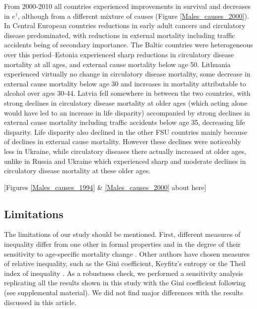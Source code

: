 \documentclass{article}
\begin{document}
\begin{spacing}{1.5}
From 2000-2010 all countries experienced improvements in survival and decreases in $e^\dagger$, although from a different mixture of causes (Figure \ref{Males_causes_2000}). In Central European countries reductions in early adult cancers and circulatory disease predominated, with reductions in external mortality including traffic accidents being of secondary importance. The Baltic countries were heterogeneous over this period--Estonia experienced sharp reductions in circulatory disease mortality at all ages, and external cause mortality below age 50. Lithuania experienced virtually no change in circulatory disease mortality, some decrease in external cause mortality below age 30 and increases in mortality attributable to alcohol over ages 30-44. Latvia fell somewhere in between the two countries, with strong declines in circulatory disease mortality at older ages (which acting alone would have led to an increase in life disparity) accompanied by strong declines in external cause mortality including traffic accidents below age 35, decreasing life disparity. Life disparity also declined in the other FSU countries mainly because of declines in external cause mortality. However these declines were noticeably less in Ukraine, while circulatory diseases there actually increased at older ages, unlike in Russia and Ukraine which experienced sharp and moderate declines in circulatory disease mortality at these older ages.\\



\begin{center}
[Figures \ref{Males_causes_1994} \& \ref{Males_causes_2000} about here]\\
\end{center}


\subsection*{Limitations} 
The limitations of our study should be mentioned. First, different measures of inequality differ from one other in formal properties and in the degree of their sensitivity to age-specific mortality change \citep{vanraalte2013}. Other authors have chosen measures of relative inequality, such as the Gini coefficient, Keyfitz's entropy or the Theil index of inequality \citep{shkolnikov2003,moser2005world,smits2009,colchero2016emergence}. As a robustness check, we performed a sensitivity analysis replicating all the results shown in this study with the Gini coefficient following \citet{shkolnikov2003} (see supplemental material). We did not find major differences with the results discussed in this article. \\


\end{spacing}
\end{document}
